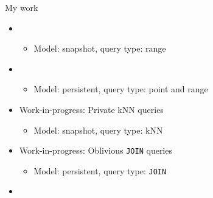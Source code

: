 	\begin{frame}{My work}

		\begin{itemize}
			\item<1> 

				\begin{itemize}
					\item \small Model: \alert{snapshot}, query type: \alert{range} \normalsize
				\end{itemize}

			\item<2> 

				\begin{itemize}
					\item \small Model: \alert{persistent}, query type: \alert{point} and \alert{range} \normalsize
				\end{itemize}

			\item<3> Work-in-progress: Private kNN queries

			\begin{itemize}
				\item \small Model: \alert{snapshot}, query type: \alert{kNN} \normalsize
			\end{itemize}

			\item<4> Work-in-progress: Oblivious \texttt{JOIN} queries

			\begin{itemize}
				\item \small Model: \alert{persistent}, query type: \alert{\texttt{JOIN}} \normalsize
			\end{itemize}

			\item<5> 

		\end{itemize}

	\end{frame}

